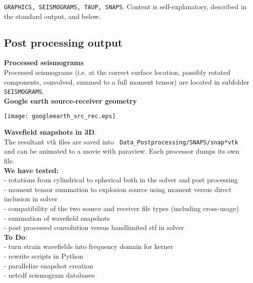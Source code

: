 \documentclass[11pt,letter,fleqn,english,notitlepage]{article}
\begin{document}
{\tt GRAPHICS, SEISMOGRAMS, TAUP, SNAPS}. 
Content is self-explanatory, described in the standard output, and below.
\newpage
\subsection{Post processing output}

\noindent \textbf{Processed seismograms}\\
Processed seismograms (i.e. at the correct surface location, possibly rotated
components, convolved, summed to a full moment tensor) are located in subfolder
{\tt SEISMOGRAMS}.\\

\noindent \textbf{Google earth source-receiver geometry}\\
\begin{figure*}[htb]
    \begin{center}
        \texttt{[image: googleearth\_src\_rec.eps]}
        \caption{\textit{The kml file output from post processing. It contains
        the rotated, original source-receiver geometry. Mouse-clicks on
        earthquake location provide source information, mouse-clicks on
        receiver pins receiver location information and graphics of the local
        seismograms.}}
    \end{center}
\end{figure*}

\noindent \textbf{Wavefield snapshots in 3D}.\\
The resultant vtk files are saved into {\tt
Data\_Postprocessing/SNAPS/snap*vtk} and can be animated to a movie with
paraview. Each processor dumps its own file.\\

\noindent \textbf{We have tested:}\\
- rotations from cylindrical to spherical both in the solver and post processing\\
- moment tensor summation to explosion source using moment versus direct inclusion in solver\\
- compatibility of the two source and receiver file types (including cross-usage)\\
- summation of wavefield snapshots\\
- post processed convolution versus bandlimited stf in solver\\

\noindent \textbf{To Do}:\\
- turn strain wavefields into frequency domain for kerner\\
- rewrite scripts in Python\\
- parallelize snapshot creation\\
- netcdf seismogram databases
\end{document}
